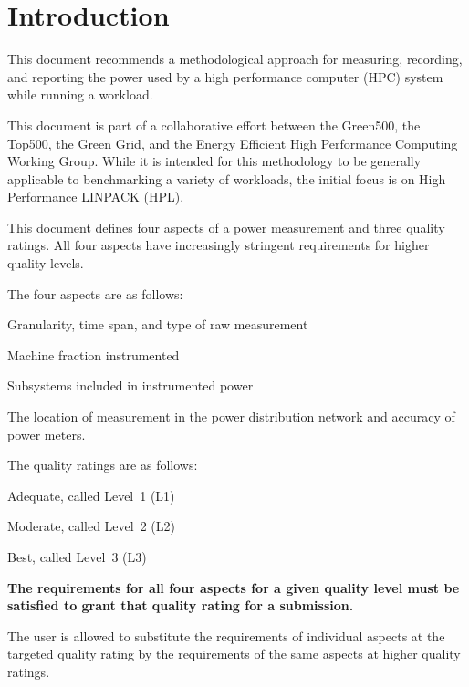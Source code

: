 \chapter{Introduction}
\label{sec:intro}

\noindent
This document recommends a methodological approach for measuring, recording, and reporting the power used by a high performance 
computer (HPC) system while
running a workload. 
\wl

\noindent
This document is part of a collaborative effort between the Green500, the Top500, 
the Green Grid, and the Energy Efficient High Performance Computing Working Group.  While 
it is intended for this methodology to be generally applicable to benchmarking a variety of 
workloads, the initial focus is on High Performance LINPACK (HPL). 
\wl

\noindent
This document defines four aspects of a power measurement and three quality ratings. All 
four aspects have increasingly stringent requirements for higher quality levels.  
\wl

\noindent
The four aspects are as follows:

\begin{packed_enum}
\item 
Granularity, time span, and type of raw measurement
\item 
Machine fraction instrumented
\item 
Subsystems included in instrumented power
\item 
The location of measurement in the power distribution network and accuracy of power meters.
\end{packed_enum}

\noindent
The quality ratings are as follows:

\begin{packed_item}
\item 
Adequate, called Level~1 (L1)
\item
Moderate, called Level~2 (L2)
\item
Best, called Level~3 (L3)
\end{packed_item}

\noindent
\textbf{The requirements for all four aspects for a given quality level must be satisfied to grant that quality rating for a submission.}
\wl

\noindent
The user is allowed to substitute the requirements of individual aspects at the targeted quality rating by the requirements of the same aspects at higher quality ratings.
\wl
